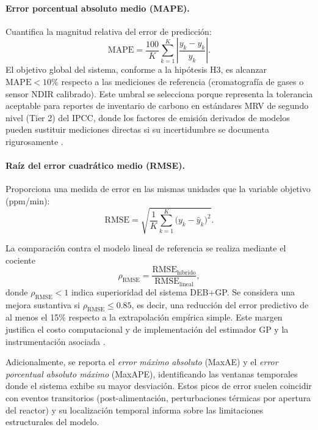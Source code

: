 \paragraph{Error porcentual absoluto medio (MAPE).}
Cuantifica la magnitud relativa del error de predicción:
\begin{equation}
    \label{eq:cap4_mape_definicion}
    \mathrm{MAPE} = \frac{100}{K}\sum_{k=1}^{K}
    \left|\frac{y_k - \hat{y}_k}{y_k}\right|.
\end{equation}
El objetivo global del sistema, conforme a la hipótesis H3, es alcanzar $\mathrm{MAPE} < \num{10}\%$ respecto a las mediciones de referencia (cromatografía de gases o sensor NDIR calibrado). Este umbral se selecciona porque representa la tolerancia aceptable para reportes de inventario de carbono en estándares MRV de segundo nivel (Tier 2) del IPCC, donde los factores de emisión derivados de modelos pueden sustituir mediciones directas si su incertidumbre se documenta rigurosamente \parencite{rossiEstimatingDynamicsGreenhouse2024}.

\paragraph{Raíz del error cuadrático medio (RMSE).}
Proporciona una medida de error en las mismas unidades que la variable objetivo (ppm/min):
\begin{equation}
    \label{eq:cap4_rmse_definicion}
    \mathrm{RMSE} = \sqrt{\frac{1}{K}\sum_{k=1}^{K}\bigl(y_k - \hat{y}_k\bigr)^{2}}.
\end{equation}

La comparación contra el modelo lineal de referencia se realiza mediante el cociente
\begin{equation}
    \label{eq:cap4_ratio_rmse}
    \rho_{\mathrm{RMSE}} = \frac{\mathrm{RMSE}_{\mathrm{híbrido}}}
    {\mathrm{RMSE}_{\mathrm{lineal}}},
\end{equation}
donde $\rho_{\mathrm{RMSE}} < 1$ indica superioridad del sistema DEB+GP. Se considera una mejora sustantiva si $\rho_{\mathrm{RMSE}} \leq \num{0.85}$, es decir, una reducción del error predictivo de al menos el \num{15}\% respecto a la extrapolación empírica simple. Este margen justifica el costo computacional y de implementación del estimador GP y la instrumentación asociada \parencite{biagiDevelopmentMachineLearningbased2024}.

Adicionalmente, se reporta el \emph{error máximo absoluto} (MaxAE) y el \emph{error porcentual absoluto máximo} (MaxAPE), identificando las ventanas temporales donde el sistema exhibe su mayor desviación. Estos picos de error suelen coincidir con eventos transitorios (post-alimentación, perturbaciones térmicas por apertura del reactor) y su localización temporal informa sobre las limitaciones estructurales del modelo.

